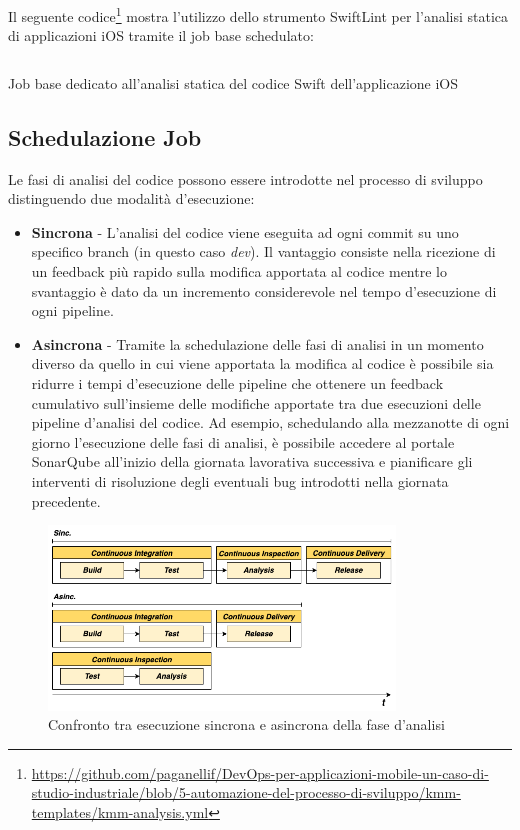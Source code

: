 Il seguente codice\footnote{\href{https://github.com/paganellif/DevOps-per-applicazioni-mobile-un-caso-di-studio-industriale/blob/5-automazione-del-processo-di-sviluppo/kmm-templates/kmm-analysis.yml}{https://github.com/paganellif/DevOps-per-applicazioni-mobile-un-caso-di-studio-industriale/blob/5-automazione-del-processo-di-sviluppo/kmm-templates/kmm-analysis.yml}} mostra l'utilizzo dello strumento SwiftLint per l'analisi statica di applicazioni iOS tramite il job base schedulato:

\begin{listing}[H]
    \inputminted{yaml}{code/ios-sast-job.yaml}
    \caption{Job base dedicato all'analisi statica del codice Swift dell'applicazione iOS}
\end{listing}

\subsection{Schedulazione Job}
Le fasi di analisi del codice possono essere introdotte nel processo di sviluppo distinguendo due modalità d'esecuzione:

\begin{itemize}
    \item \textbf{Sincrona} - L'analisi del codice viene eseguita ad ogni commit su uno specifico branch (in questo caso \textit{dev}). Il vantaggio consiste nella ricezione di un feedback più rapido sulla modifica apportata al codice mentre lo svantaggio è dato da un incremento considerevole nel tempo d'esecuzione di ogni pipeline.
    
    \item \textbf{Asincrona} - Tramite la schedulazione delle fasi di analisi in un momento diverso da quello in cui viene apportata la modifica al codice è possibile sia ridurre i tempi d'esecuzione delle pipeline che ottenere un feedback cumulativo sull'insieme delle modifiche apportate tra due esecuzioni delle pipeline d'analisi del codice. Ad esempio, schedulando alla mezzanotte di ogni giorno l'esecuzione delle fasi di analisi, è possibile accedere al portale SonarQube all'inizio della giornata lavorativa successiva e pianificare gli interventi di risoluzione degli eventuali bug introdotti nella giornata precedente.
\end{itemize}

\begin{figure}[H]
    \centering
    \includegraphics[width=0.82\textwidth]{img/inspection-sync-async.png}
    \caption{Confronto tra esecuzione sincrona e asincrona della fase d'analisi}
    \label{inspection-sync-async}
\end{figure}

